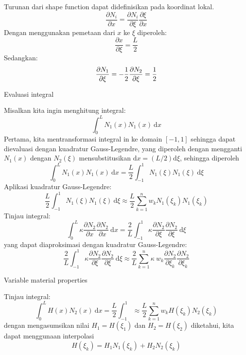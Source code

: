 Turunan dari shape function dapat didefinisikan pada koordinat lokal.
$$
\frac{\partial N_i}{\partial x} =
\frac{\partial N_i}{\partial \xi}
\frac{\partial \xi}{\partial x}
$$
Dengan menggunakan pemetaan dari $x$ ke $\xi$ diperoleh:
$$
\frac{\partial x}{\partial \xi} = \frac{L}{2}
$$
 Sedangkan:
$$
\frac{\partial N_1}{\partial \xi} = -\frac{1}{2} \\
\frac{\partial N_2}{\partial \xi} = \frac{1}{2}
$$

Evaluasi integral

Misalkan kita ingin menghitung integral:
$$
\int_{0}^{L} N_{1}(x) N_{1}(x)\ \mathrm{d}x
$$
Pertama, kita mentransformasi integral in ke domain $[-1,1]$ sehingga dapat dievaluasi dengan kuadratur Gauss-Legendre, yang diperoleh dengan mengganti $N_1(x)$ dengan $N_{2}(\xi)$ mensubstitusikan $\mathrm{d}x = (L/2)\mathrm{d}\xi$, sehingga diperoleh
$$
\int_{0}^{L} N_{1}(x) N_{1}(x)\ \mathrm{d}x = \frac{L}{2}
\int_{-1}^{1} N_{1}(\xi) N_{1}(\xi)\ \mathrm{d}\xi
$$
Aplikasi kuadratur Gauss-Legendre:
$$
\frac{L}{2}
\int_{-1}^{1} N_{1}(\xi) N_{1}(\xi)\ \mathrm{d}\xi \approx
\frac{L}{2} \sum_{k=1}^{n} w_{k} N_{1}(\xi_{k}) N_{1}(\xi_{k})
$$
Tinjau integral:
$$
\int_{0}^{L} \kappa \frac{\partial N_2}{\partial x}
\frac{\partial N_2}{\partial x} \ \mathrm{d}x =
\frac{2}{L} \int_{-1}^{1} \kappa \frac{\partial N_2}{\partial \xi}
\frac{\partial N_2}{\partial \xi} \ \mathrm{d}\xi
$$
yang dapat diaproksimasi dengan kuadratur Gauss-Legendre:
$$
\frac{2}{L} \int_{-1}^{1} \kappa \frac{\partial N_2}{\partial \xi}
\frac{\partial N_2}{\partial \xi} \ \mathrm{d}\xi \approx
\frac{2}{L} \sum_{k=1}^{n} \kappa \ w_{k}
\frac{\partial N_2}{\partial \xi_{k}}
\frac{\partial N_2}{\partial \xi_{k}}
$$

Variable material properties

Tinjau integral:
$$
\int_{0}^{L} H(x) N_{2}(x)\ \mathrm{d}x = \frac{L}{2}\int_{-1}^{1} \approx
\frac{L}{2}\sum_{k=1}^{n} w_{k} H(\xi_{k}) N_{2}(\xi_{k})
$$
dengan mengasumsikan nilai $H_1 = H(\xi_1)$ dan $H_2 = H(\xi_2)$ diketahui, kita dapat menggunaan interpolasi
$$
H(\xi_{k}) = H_1 N_{1}(\xi_{k}) + H_2 N_{2}(\xi_{k})
$$


%
%


